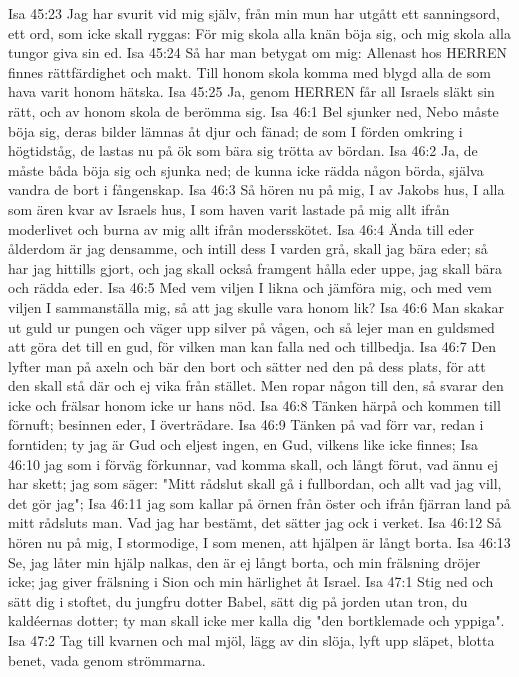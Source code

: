 Isa 45:23  Jag har svurit vid mig själv, från min mun har utgått ett sanningsord, ett ord, som icke skall ryggas: För mig skola alla knän böja sig, och mig skola alla tungor giva sin ed.
Isa 45:24  Så har man betygat om mig: Allenast hos HERREN finnes rättfärdighet och makt. Till honom skola komma med blygd alla de som hava varit honom hätska.
Isa 45:25  Ja, genom HERREN får all Israels släkt sin rätt, och av honom skola de berömma sig.
Isa 46:1  Bel sjunker ned, Nebo måste böja sig, deras bilder lämnas åt djur och fänad; de som I förden omkring i högtidståg, de lastas nu på ök som bära sig trötta av bördan.
Isa 46:2  Ja, de måste båda böja sig och sjunka ned; de kunna icke rädda någon börda, själva vandra de bort i fångenskap.
Isa 46:3  Så hören nu på mig, I av Jakobs hus, I alla som ären kvar av Israels hus, I som haven varit lastade på mig allt ifrån moderlivet och burna av mig allt ifrån modersskötet.
Isa 46:4  Ända till eder ålderdom är jag densamme, och intill dess I varden grå, skall jag bära eder; så har jag hittills gjort, och jag skall också framgent hålla eder uppe, jag skall bära och rädda eder.
Isa 46:5  Med vem viljen I likna och jämföra mig, och med vem viljen I sammanställa mig, så att jag skulle vara honom lik?
Isa 46:6  Man skakar ut guld ur pungen och väger upp silver på vågen, och så lejer man en guldsmed att göra det till en gud, för vilken man kan falla ned och tillbedja.
Isa 46:7  Den lyfter man på axeln och bär den bort och sätter ned den på dess plats, för att den skall stå där och ej vika från stället. Men ropar någon till den, så svarar den icke och frälsar honom icke ur hans nöd.
Isa 46:8  Tänken härpå och kommen till förnuft; besinnen eder, I överträdare.
Isa 46:9  Tänken på vad förr var, redan i forntiden; ty jag är Gud och eljest ingen, en Gud, vilkens like icke finnes;
Isa 46:10  jag som i förväg förkunnar, vad komma skall, och långt förut, vad ännu ej har skett; jag som säger: "Mitt rådslut skall gå i fullbordan, och allt vad jag vill, det gör jag";
Isa 46:11  jag som kallar på örnen från öster och ifrån fjärran land på mitt rådsluts man. Vad jag har bestämt, det sätter jag ock i verket.
Isa 46:12  Så hören nu på mig, I stormodige, I som menen, att hjälpen är långt borta.
Isa 46:13  Se, jag låter min hjälp nalkas, den är ej långt borta, och min frälsning dröjer icke; jag giver frälsning i Sion och min härlighet åt Israel.
Isa 47:1  Stig ned och sätt dig i stoftet, du jungfru dotter Babel, sätt dig på jorden utan tron, du kaldéernas dotter; ty man skall icke mer kalla dig "den bortklemade och yppiga".
Isa 47:2  Tag till kvarnen och mal mjöl, lägg av din slöja, lyft upp släpet, blotta benet, vada genom strömmarna.
